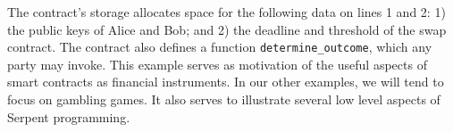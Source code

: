 \documentclass{llncs}
\begin{document}
The contract's storage 
allocates space for the following data on lines 1 and 2: 
1) the public keys of Alice and Bob;
and 2) the deadline and threshold 
of the swap contract.
The contract also defines 
a function \texttt{determine\_outcome}, which any party may invoke.
This example serves as motivation of the useful aspects of smart contracts as financial instruments. In our other examples, we will tend to focus on gambling games. It also serves to illustrate several low level aspects of Serpent programming.


%
%
%
\end{document}
